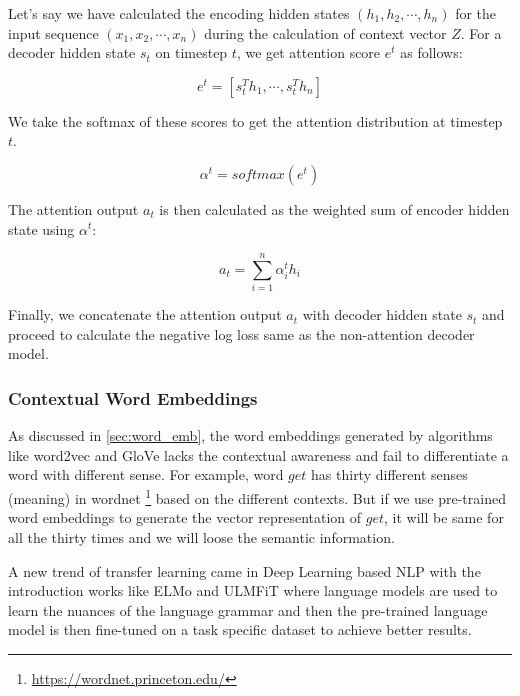 Let's say we have calculated the encoding hidden states $(h_{1},  h_{2}, \cdots, h_{n})$ for the input sequence $(x_{1}, x_{2}, \cdots, x_{n})$ during the calculation of context vector $Z$. For a decoder hidden state $s_{t}$ on timestep $t$, we get attention score $e^{t}$ as follows:

\begin{equation}
    \label{eq:att_score}
        e^{t} = [s^{T}_{t}h_{1}, \cdots, s^{T}_{t}h_{n}]
\end{equation}

We take the softmax of these scores to get the attention distribution at timestep $t$.

\begin{equation}
    \label{eq:att_dist}
        \alpha^{t} = softmax(e^{t})
\end{equation}

The attention output $a_{t}$ is then calculated as the weighted sum of encoder hidden state using $\alpha^{t}$:

\begin{equation}
    \label{eq:att_out}
        a_{t} = \sum_{i=1}^{n} \alpha_{i}^{t}h_{i}
\end{equation}

Finally, we concatenate the attention output $a_{t}$ with decoder hidden state $s_{t}$ and proceed to calculate the negative log loss same as the non-attention decoder model.

\subsubsection{Contextual Word Embeddings}\label{sec:context_we}
As discussed in \cref{sec:word_emb}, the word embeddings generated by algorithms like word2vec \cite{mikolov2013distributed} and GloVe \cite{pennington2014glove} lacks the contextual awareness and fail to differentiate a word with different sense. For example, word $get$ has thirty different senses (meaning) in wordnet \footnote{\url{https://wordnet.princeton.edu/}} based on the different contexts. But if we use pre-trained word embeddings to generate the vector representation of $get$, it will be same for all the thirty times and we will loose the semantic information. 

A new trend of transfer learning came in Deep Learning based NLP with the introduction works like ELMo \cite{peters2018deep} and ULMFiT \cite{howard2018universal} where language models are used to learn the nuances of the language grammar and then the pre-trained language model is then fine-tuned on a task specific dataset to achieve better results.

